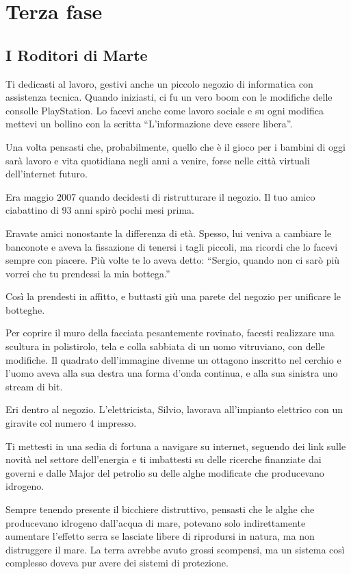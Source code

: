 \chapter{Terza fase}
\label{terza_fase} %

\section{I Roditori di Marte}
\label{rodotori_di_marte}

Ti dedicasti al lavoro, gestivi anche un piccolo negozio di informatica con assistenza tecnica. Quando iniziasti, ci fu un vero boom con le modifiche delle consolle PlayStation. Lo facevi anche come lavoro sociale e su ogni modifica mettevi un bollino con la scritta “L'informazione deve essere libera”.

Una volta pensasti che, probabilmente, quello che è il gioco per i bambini di oggi sarà lavoro e vita quotidiana negli anni a venire, forse nelle città virtuali dell'internet futuro.

Era maggio 2007 quando decidesti di ristrutturare il negozio. Il tuo amico ciabattino di 93 anni spirò pochi mesi prima.

Eravate amici nonostante la differenza di età. Spesso, lui veniva a cambiare le banconote e aveva la fissazione di tenersi i tagli piccoli, ma ricordi che lo facevi sempre con piacere. Più volte te lo aveva detto: “Sergio, quando non ci sarò più vorrei che tu prendessi la mia bottega.”

Così la prendesti in affitto, e buttasti giù una parete del negozio per unificare le botteghe.

Per coprire il muro della facciata pesantemente rovinato, facesti realizzare una scultura in polistirolo, tela e colla sabbiata di un uomo vitruviano, con delle modifiche. Il quadrato dell'immagine divenne un ottagono inscritto nel cerchio e l'uomo aveva alla sua destra una forma d'onda continua, e alla sua sinistra uno stream di bit.

Eri dentro al negozio. L'elettricista, Silvio, lavorava all'impianto elettrico con un giravite col numero 4 impresso.

Ti mettesti in una sedia di fortuna a navigare su internet, seguendo dei link sulle novità nel settore dell'energia e ti imbattesti su delle ricerche finanziate dai governi e dalle Major del petrolio su delle alghe modificate che producevano idrogeno.

Sempre tenendo presente il bicchiere distruttivo, pensasti che le alghe che producevano idrogeno dall'acqua di mare, potevano solo indirettamente aumentare l'effetto serra se lasciate libere di riprodursi in natura, ma non distruggere il mare. La terra avrebbe avuto grossi scompensi, ma un sistema così complesso doveva pur avere dei sistemi di protezione.

